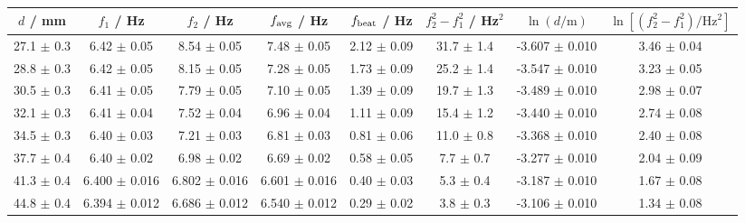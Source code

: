 \begin{tabular}{@{}cccccccc@{}}
\toprule
$d$ / mm & $f_1$ / Hz & $f_2$ / Hz & $f_{\rm avg}$ / Hz & $f_{\rm beat}$ / Hz & $f_2^2-f_1^2$ / Hz$^2$ & $\ln(d/\mathrm{m})$ & $\ln[(f_2^2-f_1^2)/\mathrm{Hz^2}]$ \\
\midrule
27.1 $\pm$ 0.3 & 6.42 $\pm$ 0.05 & 8.54 $\pm$ 0.05 & 7.48 $\pm$ 0.05 & 2.12 $\pm$ 0.09 & 31.7 $\pm$ 1.4 & -3.607 $\pm$ 0.010 & 3.46 $\pm$ 0.04 \\
28.8 $\pm$ 0.3 & 6.42 $\pm$ 0.05 & 8.15 $\pm$ 0.05 & 7.28 $\pm$ 0.05 & 1.73 $\pm$ 0.09 & 25.2 $\pm$ 1.4 & -3.547 $\pm$ 0.010 & 3.23 $\pm$ 0.05 \\
30.5 $\pm$ 0.3 & 6.41 $\pm$ 0.05 & 7.79 $\pm$ 0.05 & 7.10 $\pm$ 0.05 & 1.39 $\pm$ 0.09 & 19.7 $\pm$ 1.3 & -3.489 $\pm$ 0.010 & 2.98 $\pm$ 0.07 \\
32.1 $\pm$ 0.3 & 6.41 $\pm$ 0.04 & 7.52 $\pm$ 0.04 & 6.96 $\pm$ 0.04 & 1.11 $\pm$ 0.09 & 15.4 $\pm$ 1.2 & -3.440 $\pm$ 0.010 & 2.74 $\pm$ 0.08 \\
34.5 $\pm$ 0.3 & 6.40 $\pm$ 0.03 & 7.21 $\pm$ 0.03 & 6.81 $\pm$ 0.03 & 0.81 $\pm$ 0.06 & 11.0 $\pm$ 0.8 & -3.368 $\pm$ 0.010 & 2.40 $\pm$ 0.08 \\
37.7 $\pm$ 0.4 & 6.40 $\pm$ 0.02 & 6.98 $\pm$ 0.02 & 6.69 $\pm$ 0.02 & 0.58 $\pm$ 0.05 & 7.7 $\pm$ 0.7 & -3.277 $\pm$ 0.010 & 2.04 $\pm$ 0.09 \\
41.3 $\pm$ 0.4 & 6.400 $\pm$ 0.016 & 6.802 $\pm$ 0.016 & 6.601 $\pm$ 0.016 & 0.40 $\pm$ 0.03 & 5.3 $\pm$ 0.4 & -3.187 $\pm$ 0.010 & 1.67 $\pm$ 0.08 \\
44.8 $\pm$ 0.4 & 6.394 $\pm$ 0.012 & 6.686 $\pm$ 0.012 & 6.540 $\pm$ 0.012 & 0.29 $\pm$ 0.02 & 3.8 $\pm$ 0.3 & -3.106 $\pm$ 0.010 & 1.34 $\pm$ 0.08 \\
\bottomrule
\end{tabular}